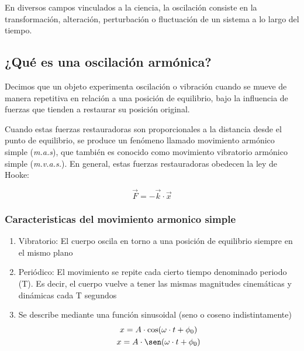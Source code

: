 \documentclass[twocolumn, 12pt]{article}
\begin{document}
En diversos campos vinculados a la ciencia, la oscilación
consiste en la transformación, alteración, perturbación o
fluctuación de un sistema a lo largo del tiempo.

\nocite{definicion-oscilacion}

\subsection{¿Qué es una oscilación armónica?}

Decimos que un objeto experimenta oscilación o vibración
cuando se mueve de manera repetitiva en relación a una
posición de equilibrio, bajo la influencia de fuerzas que
tienden a restaurar su posición original.

Cuando estas fuerzas restauradoras son proporcionales a la
distancia desde el punto de equilibrio, se produce un
fenómeno llamado movimiento armónico simple
(\textit{m.a.s}), que también es conocido como movimiento
vibratorio armónico simple (\textit{m.v.a.s.}). En general,
estas fuerzas restauradoras obedecen la ley de Hooke:

{\large
\begin{equation}
    \vec{F} = -\vec{\textit{k}} \cdot \vec{x}
    \label{eq:ley-de-hooke}
\end{equation}
}

\subsubsection{Caracteristicas del movimiento armonico simple}

\begin{enumerate}
    \item Vibratorio: El cuerpo oscila en torno a una posición de
          equilibrio siempre en el mismo plano

    \item Periódico: El movimiento se repite cada cierto tiempo
          denominado periodo (T). Es decir, el cuerpo vuelve a tener
          las mismas magnitudes cinemáticas y dinámicas cada T
          segundos

    \item Se describe mediante una función sinusoidal (seno o coseno
          indistintamente) {\large
                  \begin{equation}
                      \begin{gathered}
                          x = A \cdot \cos(\omega \cdot t + \phi_0) \\
                          x = A \cdot \sen(\omega \cdot t + \phi_0) \\
                      \end{gathered}
                  \end{equation}
              }
\end{enumerate}
\end{document}
